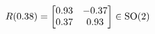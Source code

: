 \documentclass[preview]{standalone}
\begin{document}
\begin{align*}
\special{dvisvgm:raw <g id='unique000'>}R(0.38) = \begin{bmatrix} 0.93 & -0.37 \\ 0.37 & 0.93 \end{bmatrix} \in \text{SO}(2)\special{dvisvgm:raw </g>}
\end{align*}
\end{document}
